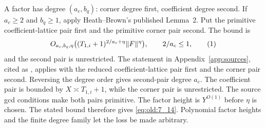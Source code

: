 A factor has degree \((a_c,b_q)\): corner degree first,
coefficient degree second. If \(a_c\ge2\) and \(b_q\ge1\), apply
Heath--Brown's published Lemma~2. Put the primitive coefficient-lattice
pair first and the primitive corner pair second. The bound is
\[
 O_{a_c,b_q,\eta}\bigl((T_{1,i}+1)^{2/a_c+\eta}
 \|F\|^\eta\bigr),\qquad 2/a_c\le1,
\AutoTag{eq:old:7_14}
\]
and the second pair is unrestricted. The statement in
Appendix~\ref{app:sources}, cited as
\cite[Lemma~2, p.~8]{HB2012}, applies with the reduced coefficient-lattice
pair first and the corner pair second. Reversing the degree order gives
second-pair degree \(a_c\). The coefficient pair is bounded by
\(X\asymp T_{1,i}+1\), while the corner pair is unrestricted. The source
gcd conditions make both pairs primitive. The factor height is
\(Y^{O(1)}\) before \(\eta\) is chosen. The stated bound therefore gives
\eqref{eq:old:7_14}. Polynomial factor heights and the finite degree family
let the loss be made arbitrary.

